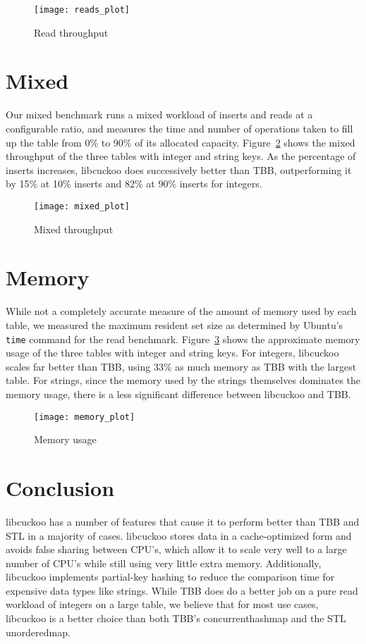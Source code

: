 \documentclass[12pt, letterpaper]{article}
\newcommand{\myfigwidth}{0.8\textwidth}
\begin{document}
\begin{figure}
  \centering
  \texttt{[image: reads\_plot]}
  \caption{Read throughput}
  \label{fig:reads}
\end{figure}

\section{Mixed}
\label{sec:mixed}

Our mixed benchmark runs a mixed workload of inserts and reads at a
configurable ratio, and measures the time and number of operations
taken to fill up the table from 0\% to 90\% of its allocated capacity.
Figure~\ref{fig:mixed} shows the mixed throughput of the three tables
with integer and string keys. As the percentage of inserts increases,
libcuckoo does successively better than TBB, outperforming it by 15\%
at 10\% inserts and 82\% at 90\% inserts for integers.

\begin{figure}
  \centering
  \texttt{[image: mixed\_plot]}
  \caption{Mixed throughput}
  \label{fig:mixed}
\end{figure}

\section{Memory}
\label{sec:memory}

While not a completely accurate measure of the amount of memory used
by each table, we measured the maximum resident set size as determined
by Ubuntu's \texttt{time} command for the read benchmark.
Figure~\ref{fig:memory} shows the approximate memory usage of the
three tables with integer and string keys. For integers, libcuckoo
scales far better than TBB, using 33\% as much memory as TBB with the
largest table. For strings, since the memory used by the strings
themselves dominates the memory usage, there is a less significant
difference between libcuckoo and TBB.

\begin{figure}
  \centering
  \texttt{[image: memory\_plot]}
  \caption{Memory usage}
  \label{fig:memory}
\end{figure}

\section{Conclusion}
\label{sec:conclusion}

libcuckoo has a number of features that cause it to perform better
than TBB and STL in a majority of cases. libcuckoo stores data in a
cache-optimized form and avoids false sharing between CPU's, which
allow it to scale very well to a large number of CPU's while still
using very little extra memory. Additionally, libcuckoo implements
partial-key hashing to reduce the comparison time for expensive data
types like strings. While TBB does do a better job on a pure read
workload of integers on a large table, we believe that for most use
cases, libcuckoo is a better choice than both TBB's
{concurrent\textunderscore hash\textunderscore map} and the STL
{unordered\textunderscore map}.
\end{document}
